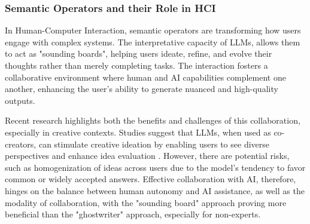 

\subsubsection{ Semantic Operators and their Role in HCI}

In Human-Computer Interaction, semantic operators are transforming how users engage with complex systems.
The interpretative capacity of LLMs, allows them to act as "sounding boards", helping users ideate, refine, and evolve their thoughts rather than merely completing tasks\cite{Chen2023LargeLM}.
The interaction fosters a collaborative environment where human and AI capabilities complement one another, enhancing the user’s ability to generate nuanced and high-quality outputs.

Recent research highlights both the benefits and challenges of this collaboration, especially in creative contexts.
Studies suggest that LLMs, when used as co-creators, can stimulate creative ideation by enabling users to see diverse perspectives and enhance idea evaluation \cite{OToole2024ExtendingHC}\cite{shaer2024ai}.
However, there are potential risks, such as homogenization of ideas across users due to the model’s tendency to favor common or widely accepted answers\cite{Anderson2024HomogenizationEO}.
Effective collaboration with AI, therefore, hinges on the balance between human autonomy and AI assistance, as well as the modality of collaboration, with the "sounding board" approach proving more beneficial than the "ghostwriter" approach, especially for non-experts\cite{Chen2023LargeLM}.

